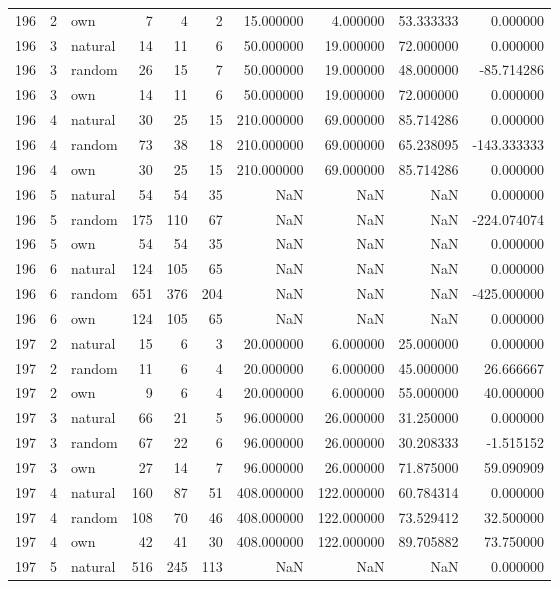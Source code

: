 \begin{table}[htbp]
\begin{tabular}{rrlrrrrrrr}
196 & 2 & own & 7 & 4 & 2 & 15.000000 & 4.000000 & 53.333333 & 0.000000 \\
196 & 3 & natural & 14 & 11 & 6 & 50.000000 & 19.000000 & 72.000000 & 0.000000 \\
196 & 3 & random & 26 & 15 & 7 & 50.000000 & 19.000000 & 48.000000 & -85.714286 \\
196 & 3 & own & 14 & 11 & 6 & 50.000000 & 19.000000 & 72.000000 & 0.000000 \\
196 & 4 & natural & 30 & 25 & 15 & 210.000000 & 69.000000 & 85.714286 & 0.000000 \\
196 & 4 & random & 73 & 38 & 18 & 210.000000 & 69.000000 & 65.238095 & -143.333333 \\
196 & 4 & own & 30 & 25 & 15 & 210.000000 & 69.000000 & 85.714286 & 0.000000 \\
196 & 5 & natural & 54 & 54 & 35 & NaN & NaN & NaN & 0.000000 \\
196 & 5 & random & 175 & 110 & 67 & NaN & NaN & NaN & -224.074074 \\
196 & 5 & own & 54 & 54 & 35 & NaN & NaN & NaN & 0.000000 \\
196 & 6 & natural & 124 & 105 & 65 & NaN & NaN & NaN & 0.000000 \\
196 & 6 & random & 651 & 376 & 204 & NaN & NaN & NaN & -425.000000 \\
196 & 6 & own & 124 & 105 & 65 & NaN & NaN & NaN & 0.000000 \\
197 & 2 & natural & 15 & 6 & 3 & 20.000000 & 6.000000 & 25.000000 & 0.000000 \\
197 & 2 & random & 11 & 6 & 4 & 20.000000 & 6.000000 & 45.000000 & 26.666667 \\
197 & 2 & own & 9 & 6 & 4 & 20.000000 & 6.000000 & 55.000000 & 40.000000 \\
197 & 3 & natural & 66 & 21 & 5 & 96.000000 & 26.000000 & 31.250000 & 0.000000 \\
197 & 3 & random & 67 & 22 & 6 & 96.000000 & 26.000000 & 30.208333 & -1.515152 \\
197 & 3 & own & 27 & 14 & 7 & 96.000000 & 26.000000 & 71.875000 & 59.090909 \\
197 & 4 & natural & 160 & 87 & 51 & 408.000000 & 122.000000 & 60.784314 & 0.000000 \\
197 & 4 & random & 108 & 70 & 46 & 408.000000 & 122.000000 & 73.529412 & 32.500000 \\
197 & 4 & own & 42 & 41 & 30 & 408.000000 & 122.000000 & 89.705882 & 73.750000 \\
197 & 5 & natural & 516 & 245 & 113 & NaN & NaN & NaN & 0.000000 \\

\end{tabular}
\end{table}

